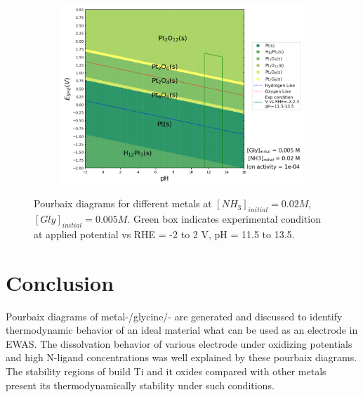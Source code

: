 \documentclass[journal=jacsat,manuscript=article]{achemso}
\begin{document}
\begin{figure}[htbp]
    \begin{subfigure}[b]{0.3\textwidth}
        \includegraphics[width=\textwidth]{Figures/pourbaix_diagrams/Pt-NH3-H2O_activity=1e-04_[NH3]=0.02M_[Gly]=0.005M_[CN]=0.png}
        \subcaption{}\label{fig:Pt_Pourbaix}
    \end{subfigure}

    \caption{Pourbaix diagrams for different metals at $[NH_3]_{initial}= 0.02M$, $[Gly]_{initial}=0.005M$. Green box indicates experimental condition at applied potential vs RHE = -2 to 2 V, pH = 11.5 to 13.5.}
    \label{fig:Pourbaix_NH3_Gly}
\end{figure}



\section{Conclusion}
Pourbaix diagrams of metal-/glycine/- are generated and discussed to identify thermodynamic behavior of an ideal material what can be used as an electrode in EWAS. The dissolvation behavior of various electrode under oxidizing potentials and high N-ligand concentrations was well explained by these pourbaix diagrams. The stability regions of build Ti and it oxides compared with other metals present its thermodynamically stability under such conditions. 
\end{document}
